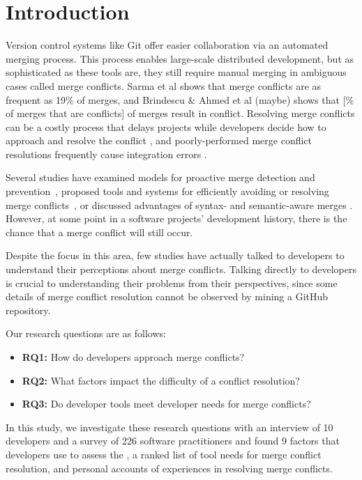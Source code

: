 \section{Introduction}\label{introduction}


Version control systems like Git offer easier collaboration via an automated merging process. This process enables large-scale distributed development, but as sophisticated as these tools are, they still require manual merging in ambiguous cases called merge conflicts. Sarma et al \cite{cassandra} shows that merge conflicts are as frequent as 19\% of merges, and Brindescu \& Ahmed et al (maybe) shows that [\% of merges that are conflicts] of merges result in conflict. Resolving merge conflicts can be a costly process that delays projects while developers decide how to approach and resolve the conflict \cite{cassandra}, and poorly-performed merge conflict resolutions frequently cause integration errors \cite{bird-branches-conflict}. 


Several studies have examined models for proactive merge detection and prevention~\cite{Brun2011}\cite{palantir}\cite{Guimaraes}, proposed tools and systems for efficiently avoiding or resolving merge conflicts~\cite{nishimura}\cite{mens2002state}, or discussed advantages of syntax- and semantic-aware merges \cite{danny_refactorings}\cite{hunt2002extensible}. However, at some point in a software projects' development history, there is the chance that a merge conflict will still occur. 


Despite the focus in this area, few studies have actually talked to developers to understand their perceptions about merge conflicts. Talking directly to developers is crucial to understanding their problems from their perspectives, since some details of merge conflict resolution cannot be observed by mining a GitHub repository. 

Our research questions are as follows:
\begin{itemize}
\item\textbf{RQ1:} How do developers approach merge conflicts?\\
\item\textbf{RQ2:} What factors impact the difficulty of a conflict resolution?\\
\item\textbf{RQ3:} Do developer tools meet developer needs for merge conflicts?\\
\end{itemize}

In this study, we investigate these research questions with an interview of 10 developers and a survey of 226 software practitioners and found 9 factors that developers use to assess the , a ranked list of tool needs for merge conflict resolution, and personal accounts of experiences in resolving merge conflicts.
